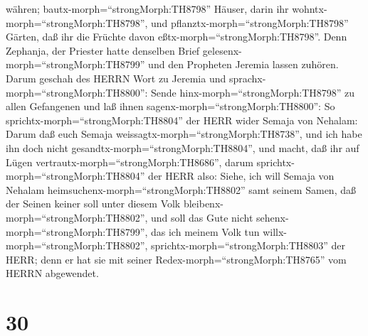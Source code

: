 währen; bautx-morph=``strongMorph:TH8798'' Häuser, darin ihr
wohntx-morph=``strongMorph:TH8798'', und
pflanztx-morph=``strongMorph:TH8798'' Gärten, daß ihr die Früchte davon
eßtx-morph=``strongMorph:TH8798''.  Denn Zephanja, der
Priester hatte denselben Brief gelesenx-morph=``strongMorph:TH8799'' und
den Propheten Jeremia lassen zuhören.  Darum geschah des
HERRN Wort zu Jeremia und sprachx-morph=``strongMorph:TH8800'':
 Sende hinx-morph=``strongMorph:TH8798'' zu allen
Gefangenen und laß ihnen sagenx-morph=``strongMorph:TH8800'': So
sprichtx-morph=``strongMorph:TH8804'' der HERR wider Semaja von Nehalam:
Darum daß euch Semaja weissagtx-morph=``strongMorph:TH8738'', und ich
habe ihn doch nicht gesandtx-morph=``strongMorph:TH8804'', und macht,
daß ihr auf Lügen vertrautx-morph=``strongMorph:TH8686'', 
darum sprichtx-morph=``strongMorph:TH8804'' der HERR also: Siehe, ich
will Semaja von Nehalam heimsuchenx-morph=``strongMorph:TH8802'' samt
seinem Samen, daß der Seinen keiner soll unter diesem Volk
bleibenx-morph=``strongMorph:TH8802'', und soll das Gute nicht
sehenx-morph=``strongMorph:TH8799'', das ich meinem Volk tun
willx-morph=``strongMorph:TH8802'',
sprichtx-morph=``strongMorph:TH8803'' der HERR; denn er hat sie mit
seiner Redex-morph=``strongMorph:TH8765'' vom HERRN abgewendet.

\hypertarget{section-29}{%
\section{30}\label{section-29}}

